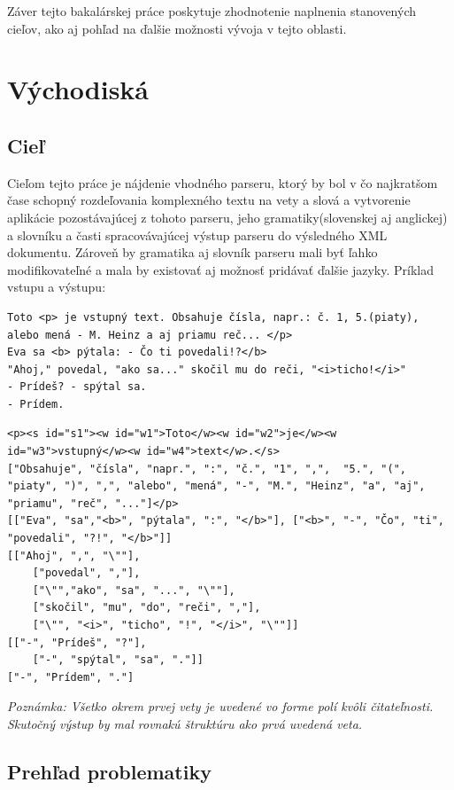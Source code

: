 \documentclass[12pt,a4paper]{report}
\theoremstyle{definition}
\theoremstyle{remark}
\begin{document}
Záver tejto bakalárskej práce poskytuje zhodnotenie naplnenia stanovených cieľov, ako aj pohľad na ďalšie možnosti vývoja v tejto oblasti.

\chapter{Východiská}
\section{Cieľ}


Cieľom tejto práce je nájdenie vhodného parseru, ktorý by bol v čo najkratšom čase schopný rozdeľovania komplexného textu na vety a slová a vytvorenie aplikácie pozostávajúcej z tohoto parseru, jeho gramatiky(slovenskej aj anglickej) a slovníku a časti spracovávajúcej výstup parseru do výsledného XML dokumentu. Zároveň by gramatika aj slovník parseru mali byť ľahko modifikovateľné a mala by existovať aj možnosť pridávať ďalšie jazyky. Príklad vstupu a výstupu:
\begin{lstlisting}[caption={Vstup},style=htmlcssjs, label={lst:vstup}]
Toto <p> je vstupný text. Obsahuje čísla, napr.: č. 1, 5.(piaty), alebo mená - M. Heinz a aj priamu reč... </p>
Eva sa <b> pýtala: - Čo ti povedali!?</b>
"Ahoj," povedal, "ako sa..." skočil mu do reči, "<i>ticho!</i>"
- Prídeš? - spýtal sa.
- Prídem.
\end{lstlisting}
\begin{lstlisting}[caption={Výstup},style=htmlcssjs, label={lst:vystup}]
<p><s id="s1"><w id="w1">Toto</w><w id="w2">je</w><w id="w3">vstupný</w><w id="w4">text</w>.</s>
["Obsahuje", "čísla", "napr.", ":", "č.", "1", ",",  "5.", "(", "piaty", ")", ",", "alebo", "mená", "-", "M.", "Heinz", "a", "aj", "priamu", "reč", "..."]</p>
[["Eva", "sa","<b>", "pýtala", ":", "</b>"], ["<b>", "-", "Čo", "ti", "povedali", "?!", "</b>"]]
[["Ahoj", ",", "\""],
	["povedal", ","],
	["\"","ako", "sa", "...", "\""],
	["skočil", "mu", "do", "reči", ","],
	["\"", "<i>", "ticho", "!", "</i>", "\""]]
[["-", "Prídeš", "?"],
	["-", "spýtal", "sa", "."]]
["-", "Prídem", "."]
\end{lstlisting}
\noindent \textit{Poznámka: Všetko okrem prvej vety je uvedené vo forme polí kvôli čitateľnosti. Skutočný výstup by mal rovnakú štruktúru ako prvá uvedená veta.}

\section{Prehľad problematiky}
\end{document}
